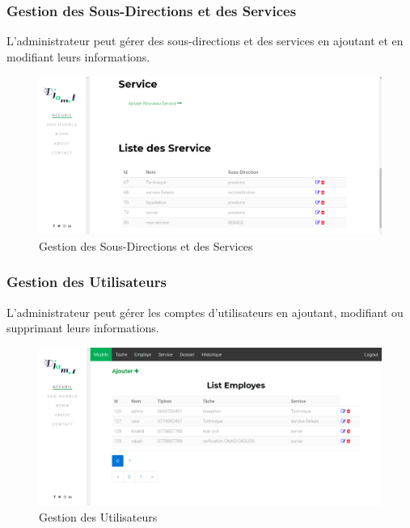 \subsubsection{Gestion des  Sous-Directions et des Services }
L'administrateur peut gérer des sous-directions et des services en ajoutant et en modifiant leurs informations.
\begin{figure}[H]
	\centering
	\includegraphics[width=1\linewidth]{images/captures/capturesadmin/service}
	\caption{Gestion des  Sous-Directions et des Services}
	\label{fig:service}
\end{figure}


 
 \subsubsection{Gestion des  Utilisateurs}
 
 L'administrateur peut gérer les comptes d'utilisateurs en ajoutant, modifiant ou supprimant leurs informations.
\begin{figure}[H]
	\centering
	\includegraphics[width=1\linewidth]{images/captures/capturesadmin/user}
	\caption{Gestion des  Utilisateurs}
	\label{fig:user}
\end{figure}




